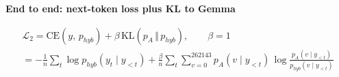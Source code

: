 \documentclass[border=40pt]{standalone}
\begin{document}
\begin{minipage}{26cm}
{\sffamily\bfseries\Large\color{muted} End to end: next-token loss plus KL to Gemma}\par\vspace{-14pt}
{\LARGE
\begin{gather*}
\mathcal{L}_2 = \mathrm{CE}(y,\,p_{hyb}) + \beta\,\mathrm{KL}(p_A \,\Vert\, p_{hyb}), \qquad \beta = 1
\\[6pt]
= -\frac{1}{n}\sum_{t} \log p_{hyb}(y_t \mid y_{<t})
+ \frac{\beta}{n}\sum_{t}\sum_{v=0}^{262143} p_A(v \mid y_{<t})\,\log\frac{p_A(v \mid y_{<t})}{p_{hyb}(v \mid y_{<t})}
\end{gather*}}
\end{minipage}
\end{document}
